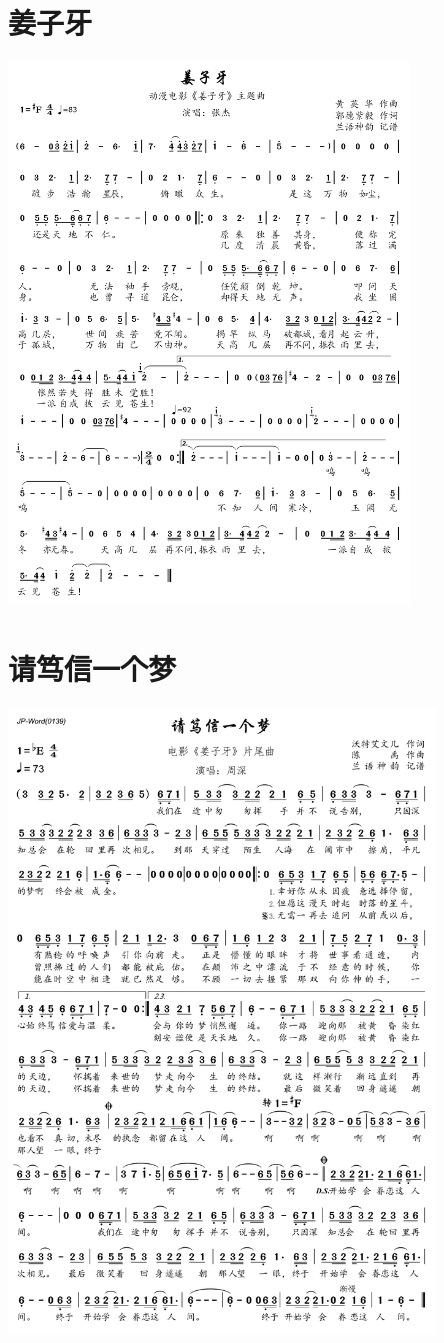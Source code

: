 \documentclass[cn,pad,twocol]{elegantbook}
\begin{document}
\section{姜子牙} \includegraphics[width=0.8\textwidth]{rpi400/20210206姜子牙主题曲.png}
\section{请笃信一个梦} \includegraphics[width=0.85\textwidth]{rpi400/20210206请笃信一个梦.png}
\end{document}
